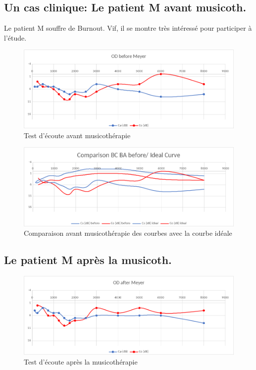 \subsection{Un cas clinique: Le patient M avant musicoth.}

 	Le patient M souffre de Burnout. Vif, il se montre très
        intéressé pour participer à l'étude.
 
 	
 	\begin{figure}[tbh]
 		\centering
 		\includegraphics[width=0.7\linewidth]{images/clinique/od_before_meyer.png}
 		\caption{Test d'écoute avant musicothérapie}
 		\label{fig:odbeforemeyer}
 	\end{figure}
 	
 	
 	
 	
 	
 	
 	\begin{figure}
 		\centering
 		\includegraphics[width=0.7\linewidth]{images/clinique/comparison_bc_ba_before_vs_ideal_curve_meyer.png}
 		\caption[Comparaison avec la courbe idéale]{Comparaison avant
                  musicothérapie des
                  courbes  avec la courbe idéale}
 		\label{fig:comparisonbcbabeforevsidealcurvemeyer}
 	\end{figure}
 	
 	
 	\subsection{Le patient M après la musicoth.}
 	\lipsum[1]
 	\begin{figure}[h]
 		\centering

 		\includegraphics[width=0.7\linewidth]{images/clinique/od_after_meyer.png}
 		\caption{Test d'écoute après la musicothérapie}
 		\label{fig:odaftermeyer}
 	\end{figure}
 
